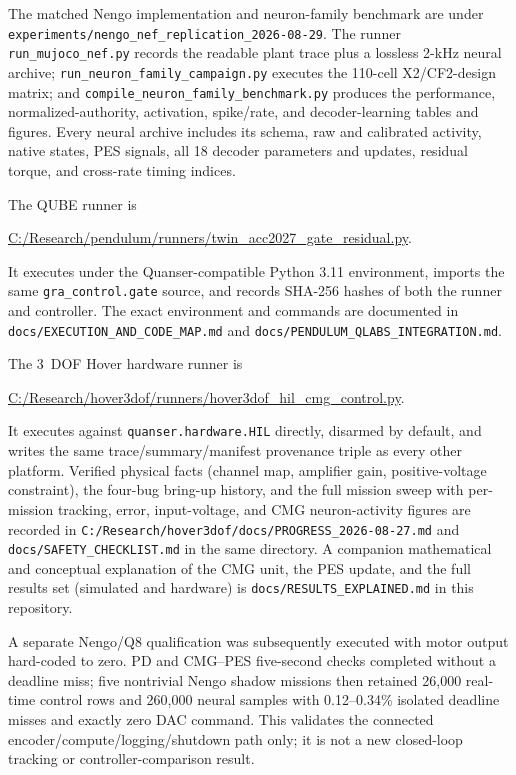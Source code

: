 \documentclass[10pt,twocolumn]{article}
\begin{document}
The matched Nengo implementation and neuron-family benchmark are under
\texttt{experiments/nengo\_nef\_replication\_2026-08-29}.  The runner
\texttt{run\_mujoco\_nef.py} records the readable plant trace plus a lossless
2-kHz neural archive; \texttt{run\_neuron\_family\_campaign.py} executes the
110-cell X2/CF2-design matrix; and
\texttt{compile\_neuron\_family\_benchmark.py} produces the performance,
normalized-authority, activation, spike/rate, and decoder-learning tables and
figures.  Every neural archive includes its schema, raw and calibrated
activity, native states, PES signals, all 18 decoder parameters and updates,
residual torque, and cross-rate timing indices.

The QUBE runner is
\begin{center}
\url{C:/Research/pendulum/runners/twin_acc2027_gate_residual.py}.
\end{center}
It executes under the Quanser-compatible Python 3.11 environment, imports the
same \texttt{gra\_control.gate} source, and records SHA-256 hashes of both the
runner and controller. The exact environment and commands are documented in
\texttt{docs/EXECUTION\_AND\_CODE\_MAP.md} and
\texttt{docs/PENDULUM\_QLABS\_INTEGRATION.md}.

The 3~DOF Hover hardware runner is
\begin{center}
\url{C:/Research/hover3dof/runners/hover3dof_hil_cmg_control.py}.
\end{center}
It executes against \texttt{quanser.hardware.HIL} directly, disarmed by
default, and writes the same trace/summary/manifest provenance triple as
every other platform. Verified physical facts (channel map, amplifier gain,
positive-voltage constraint), the four-bug bring-up history, and the full
mission sweep with per-mission tracking, error, input-voltage, and CMG
neuron-activity figures are recorded in
\texttt{C:/Research/hover3dof/docs/PROGRESS\_2026-08-27.md} and
\texttt{docs/SAFETY\_CHECKLIST.md} in the same directory. A companion
mathematical and conceptual explanation of the CMG unit, the PES update, and
the full results set (simulated and hardware) is
\texttt{docs/RESULTS\_EXPLAINED.md} in this repository.

A separate Nengo/Q8 qualification was subsequently executed with motor output
hard-coded to zero.  PD and CMG--PES five-second checks completed without a
deadline miss; five nontrivial Nengo shadow missions then retained 26,000
real-time control rows and 260,000 neural samples with 0.12--0.34\% isolated
deadline misses and exactly zero DAC command.  This validates the connected
encoder/compute/logging/shutdown path only; it is not a new closed-loop tracking
or controller-comparison result.
\end{document}

